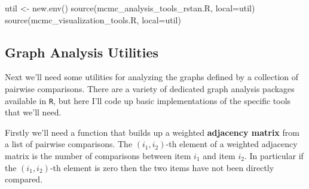 \documentclass[
  letterpaper,
  DIV=11,
  numbers=noendperiod]{scrartcl}
\newenvironment{Shaded}{\begin{snugshade}}{\end{snugshade}}
\newcommand{\AttributeTok}[1]{\textcolor[rgb]{0.40,0.45,0.13}{#1}}
\newcommand{\FunctionTok}[1]{\textcolor[rgb]{0.28,0.35,0.67}{#1}}
\newcommand{\NormalTok}[1]{\textcolor[rgb]{0.00,0.23,0.31}{#1}}
\newcommand{\OtherTok}[1]{\textcolor[rgb]{0.00,0.23,0.31}{#1}}
\newcommand{\StringTok}[1]{\textcolor[rgb]{0.13,0.47,0.30}{#1}}
\begin{document}
\begin{Shaded}
\begin{Highlighting}[]
\NormalTok{util }\OtherTok{\textless{}{-}} \FunctionTok{new.env}\NormalTok{()}
\FunctionTok{source}\NormalTok{(}\StringTok{\textquotesingle{}mcmc\_analysis\_tools\_rstan.R\textquotesingle{}}\NormalTok{, }\AttributeTok{local=}\NormalTok{util)}
\FunctionTok{source}\NormalTok{(}\StringTok{\textquotesingle{}mcmc\_visualization\_tools.R\textquotesingle{}}\NormalTok{, }\AttributeTok{local=}\NormalTok{util)}
\end{Highlighting}
\end{Shaded}

\subsection{Graph Analysis Utilities}\label{sec:graph-utils}

Next we'll need some utilities for analyzing the graphs defined by a
collection of pairwise comparisons. There are a variety of dedicated
graph analysis packages available in \texttt{R}, but here I'll code up
basic implementations of the specific tools that we'll need.

Firstly we'll need a function that builds up a weighted
\textbf{adjacency matrix} from a list of pairwise comparisons. The
\((i_{1}, i_{2})\)-th element of a weighted adjacency matrix is the
number of comparisons between item \(i_{1}\) and item \(i_{2}\). In
particular if the \((i_{1}, i_{2})\)-th element is zero then the two
items have not been directly compared.
\end{document}
